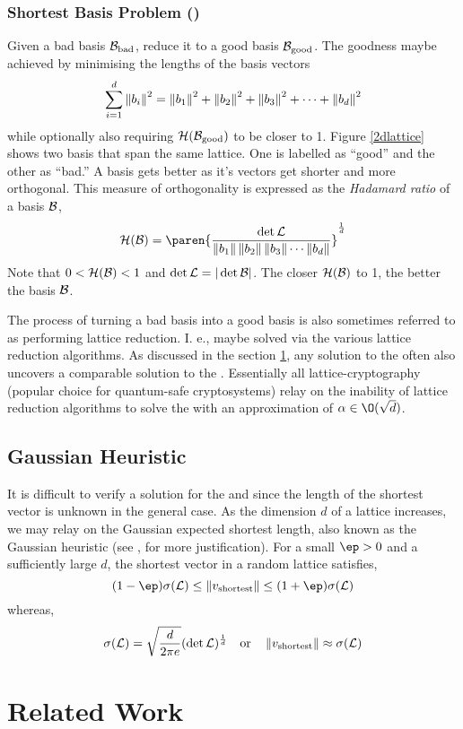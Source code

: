 \documentclass{homework}
\begin{document}
\subsubsection{Shortest Basis Problem (\SBP)} Given a bad basis
$\mathcal{B}_\text{bad}$, reduce it to a good basis $\mathcal{B}_\text{good}$. The
goodness maybe achieved by minimising the lengths of the basis vectors
\eg
\[
  \sum_{i=1}^{d}\left\lVert b_i\right\rVert^2 = \left\lVert b_1\right\rVert^2 + \left\lVert b_2\right\rVert^2 + \left\lVert b_3\right\rVert^2
  + \cdots + \left\lVert b_d\right\rVert^2
\]
while optionally also requiring $\mathcal{H}(\mathcal{B}_\text{good})$ to be
closer to 1. Figure \ref{2dlattice} shows two basis that span the same
lattice. One is labelled as ``good'' and the other as ``bad.'' A basis
gets better as it's vectors get shorter and more orthogonal. This
measure of orthogonality is expressed as the \textit{Hadamard ratio}
of a basis $\mathcal{B}$,
\[
  \mathcal{H}(\B) = \paren{
    \frac{\det \L}{\norm{b_1}\norm{b_2}\norm{b_3}\cdots \norm{b_d}}
  }^\frac{1}{d}
\]
Note that $0 < \mathcal{H}(\mathcal{B}) < 1$ and $\det \mathcal{L} = |\det \mathcal{B}|$. The
closer $\mathcal{H}(\mathcal{B})$ to 1, the better the basis $\mathcal{B}$.

The process of turning a bad basis into a good basis is also sometimes
referred to as performing lattice reduction. I. e., \SBP{} maybe
solved via the various lattice reduction algorithms. As discussed in
the section \ref{rw}, any solution to the \SBP{} often also uncovers a
comparable solution to the \appr\SVP. Essentially all
lattice-cryptography (popular choice for quantum-safe cryptosystems)
relay on the inability of lattice reduction algorithms to solve the
\appr\SVP{} with an approximation of $\alpha \in \O(\sqrt{d})$.

\subsection{Gaussian Heuristic} It is difficult to verify a solution
for the \appr\SVP{} and \SVP{} since the length of the shortest vector
is unknown in the general case. As the dimension $d$ of a lattice
increases, we may relay on the Gaussian expected shortest length, also
known as the Gaussian heuristic (see \cite{hoffstein2008introduction},
\cite{siegel1945mean} for more justification). For a small $\ep > 0$
and a sufficiently large $d$, the shortest vector in a random lattice
satisfies,
\[
  (1-\ep)\sigma(\L) \leq
  \norm{v_\text{shortest}}
  \leq (1+\ep)\sigma(\L)
\]
whereas,
\[
  \sigma(\mathcal{L}) = \sqrt{\frac{d}{2\pi e}}(\det \mathcal{L})^\frac{1}{d}
  \quad
  \text{or}
  \quad
  \left\lVert v_\text{shortest}\right\rVert \approx \sigma(\mathcal{L})
\]
\section{Related Work}\label{rw}
\end{document}
